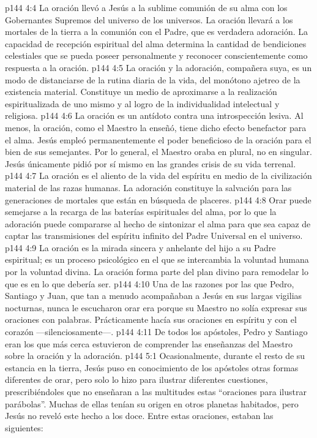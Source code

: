 \vs p144 4:4 La oración llevó a Jesús a la sublime comunión de su alma con los Gobernantes Supremos del universo de los universos. La oración llevará a los mortales de la tierra a la comunión con el Padre, que es verdadera adoración. La capacidad de recepción espiritual del alma determina la cantidad de bendiciones celestiales que se pueda poseer personalmente y reconocer conscientemente como respuesta a la oración.
\vs p144 4:5 La oración y la adoración, compañera suya, es un modo de distanciarse de la rutina diaria de la vida, del monótono ajetreo de la existencia material. Constituye un medio de aproximarse a la realización espiritualizada de uno mismo y al logro de la individualidad intelectual y religiosa.
\vs p144 4:6 La oración es un antídoto contra una introspección lesiva. Al menos, la oración, como el Maestro la enseñó, tiene dicho efecto benefactor para el alma. Jesús empleó permanentemente el poder beneficioso de la oración para el bien de sus semejantes. Por lo general, el Maestro oraba en plural, no en singular. Jesús únicamente pidió por sí mismo en las grandes crisis de su vida terrenal.
\vs p144 4:7 La oración es el aliento de la vida del espíritu en medio de la civilización material de las razas humanas. La adoración constituye la salvación para las generaciones de mortales que están en búsqueda de placeres.
\vs p144 4:8 Orar puede semejarse a la recarga de las baterías espirituales del alma, por lo que la adoración puede compararse al hecho de sintonizar el alma para que sea capaz de captar las transmisiones del espíritu infinito del Padre Universal en el universo.
\vs p144 4:9 La oración es la mirada sincera y anhelante del hijo a su Padre espiritual; es un proceso psicológico en el que se intercambia la voluntad humana por la voluntad divina. La oración forma parte del plan divino para remodelar lo que es en lo que debería ser.
\vs p144 4:10 Una de las razones por las que Pedro, Santiago y Juan, que tan a menudo acompañaban a Jesús en sus largas vigilias nocturnas, nunca le escucharon orar era porque su Maestro no solía expresar sus oraciones con palabras. Prácticamente hacía sus oraciones en espíritu y con el corazón ---silenciosamente---.
\vs p144 4:11 De todos los apóstoles, Pedro y Santiago eran los que más cerca estuvieron de comprender las enseñanzas del Maestro sobre la oración y la adoración.
\vs p144 5:1 Ocasionalmente, durante el resto de su estancia en la tierra, Jesús puso en conocimiento de los apóstoles otras formas diferentes de orar, pero solo lo hizo para ilustrar diferentes cuestiones, prescribiéndoles que no enseñaran a las multitudes estas “oraciones para ilustrar parábolas”. Muchas de ellas tenían su origen en otros planetas habitados, pero Jesús no reveló este hecho a los doce. Entre estas oraciones, estaban las siguientes:
